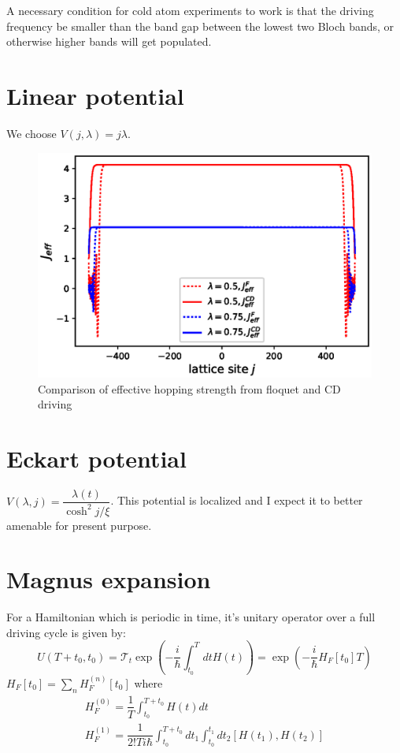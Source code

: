 \documentclass[11pt,a4paper]{article}
\begin{document}
A necessary condition for cold atom experiments to work is that the driving frequency be smaller than the band gap between the lowest two Bloch bands, or otherwise higher bands will get populated.


\section{Linear potential}
We choose $V(j, \lambda)= j \lambda$.



\begin{figure}[!ht]
\begin{center}
\includegraphics[scale=0.68]{pics/j_eff_f.eps}
\caption{Comparison of effective hopping strength from floquet and CD driving }
\end{center}
\end{figure}

\section{Eckart potential}
$V(\lambda,j) =\dfrac{ \lambda(t)}{\cosh^2 j/ \xi}$. This potential is localized and I expect it to better amenable for present purpose.


\appendix 
\section{Magnus expansion}
For a Hamiltonian which is periodic in time, it's unitary operator over a full driving cycle is given by:
\begin{equation}
U(T+ t_0, t_0)= \mathcal{T}_t\exp(- \dfrac{i}{\hbar} \int_{t_0}^T dt H(t))= \exp(- \dfrac{i}{\hbar}  H_F[t_0]T)
\end{equation}
$ H_F[t_0]= \sum_n H_F^{(n)}[t_0] $ 
where 
\begin{align*}
H_F^{(0)}= \dfrac{1}{T} \int_{t_0}^{T+t_0} H(t) dt \\
H_F^{(1)}= \dfrac{1}{2! T i \hbar} \int_{t_0}^{T+t_0}  dt_1\int_{t_0}^{t_1} dt_2  [H(t_1), H(t_2)] 
\end{align*}
\end{document}

